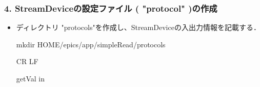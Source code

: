 \documentclass[letterpaper,10pt,dvipdfmx]{sphinxmanual}
\begin{document}
\subsubsection{4. StreamDeviceの設定ファイル ( "protocol" )の作成}
\label{\detokenize{epics/rst/example2__arduino_ADConvertor:streamdevice-protocol}}\begin{itemize}
\item {} 
ディレクトリ "protocols"を作成し、StreamDeviceの入出力情報を記載する．

\begin{sphinxVerbatim}[commandchars=\\\{\}]
\PYGZdl{} mkdir \PYGZdl{}HOME/epics/app/simpleRead/protocols
\end{sphinxVerbatim}
\def\sphinxLiteralBlockLabel{\label{\detokenize{epics/rst/example2__arduino_ADConvertor:id8}}}
\begin{sphinxVerbatim}[commandchars=\\\{\},numbers=left,firstnumber=1,stepnumber=1]
  CR LF

getVal
  in 
\end{sphinxVerbatim}

\end{itemize}
\end{document}
